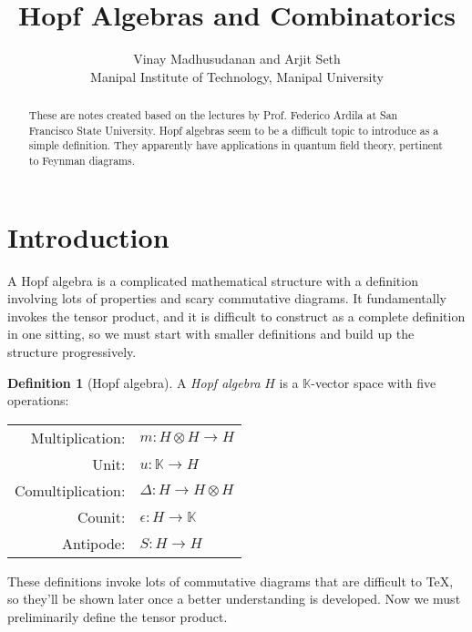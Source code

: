 \documentclass{article}
\theoremstyle{definition}
\newtheorem{Definition}{Definition}
\theoremstyle{remark}
\theoremstyle{underline}
\theoremstyle{underline}
\begin{document}
\title{\textbf{Hopf Algebras and Combinatorics}}

\author{\small Vinay Madhusudanan and Arjit Seth \\ \small Manipal Institute of Technology, Manipal University}
\date{}
\maketitle

\renewcommand{\abstractname}{Context}
\begin{abstract}
These are notes created based on the lectures by Prof. Federico Ardila at San Francisco State University. Hopf algebras seem to be a difficult topic to introduce as a simple definition. They apparently have applications in quantum field theory, pertinent to Feynman diagrams.
\end{abstract}

\begingroup
\let\clearpage\relax
\tableofcontents
\endgroup

\medskip
\medskip

\section{Introduction}\label{sec:Intro}
A Hopf algebra is a complicated mathematical structure with a definition involving lots of properties and scary commutative diagrams. It fundamentally invokes the tensor product, and it is difficult to construct as a complete definition in one sitting, so we must start with smaller definitions and build up the structure progressively.

\begin{Definition}[Hopf algebra]\label{def:HopfAlg}
A \emph{Hopf algebra} $H$ is a $\mathbb{K}$-vector space with five operations:
\begin{center}
	\begin{tabular}{rl}
		Multiplication: &   $ m\colon H \otimes H \to H$\\
		Unit: & $u\colon \mathbb{K} \to H $ \\
		Comultiplication: & 	$ \Delta\colon H \to H \otimes H$\\
		Counit: & $\epsilon\colon H \to \mathbb{K}$ \\
		Antipode: &  $ S\colon H \to H $
	\end{tabular}
\end{center}
\end{Definition}

These definitions invoke lots of commutative diagrams that are difficult to \TeX, so they'll be shown later once a better understanding is developed. Now we must preliminarily define the tensor product.
\end{document}
